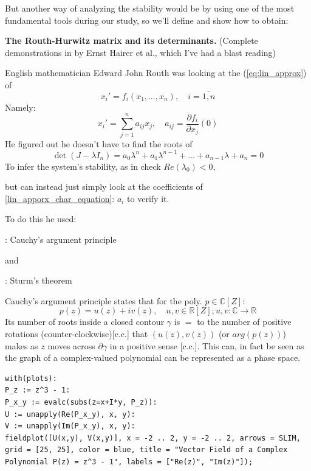 \hfill\break

But another way of analyzing the stability would be by using one of
the most fundamental tools during our study, so we'll define and show
how to obtain:

\textbf{The Routh-Hurwitz matrix and its determinants.}
(Complete demonstrations in \cite{hairer1993Nonstiff} by Ernst Hairer et al., which I've had a blast reading)

English mathematician Edward John Routh was looking at the
(\ref{eq:lin_approx}) of
\[
x_i' = f_i(x_1,\dots , x_n), \quad i = \overline{1,n}
\]
Namely:
\[
x_i' =\sum_{j=1}^{n}a_{ij} x_j, \quad a_{ij} = \frac{\partial
f_i}{\partial x_j}(0)
\]
He figured out he doesn't have to find the roots of
\begin{equation}\label{lin_apporx_char_equation}
\det(J - \lambda I_n) =
a_0 \lambda^n + a_1 \lambda^{n-1} + \dots + a_{n-1}\lambda + a_n = 0
\end{equation}
To infer the system's stability, as in check
$ Re(\lambda_0) < 0$,

but can instead just simply look at the coefficients of
\ref{lin_apporx_char_equation}: $a_{i}$ to verify it.

To do this he used:

: Cauchy's argument principle

and

: Sturm's theorem


Cauchy's argument principle states that for the poly. $p \in \mathbb{C}[Z]$:
\[
p(z) = u(z) + i v(z), \quad u, v \in \mathbb{R}[Z]; u,v : \mathbb{C}
\rightarrow \mathbb{R}
\]
Its number of roots inside a closed contour $\gamma$  is $=$ to the
number of positive rotations (counter-clockwise)[c.c.] that $(u(z),
v(z))$ (or $arg(p(z))$) makes as $z$ moves across $\partial \gamma$
in a positive sense [c.c.].
This can, in fact be seen as the graph of a complex-valued polynomial can be represented as a phase space.
\begin{verbatim}
with(plots):
P_z := z^3 - 1:
P_x_y := evalc(subs(z=x+I*y, P_z)):
U := unapply(Re(P_x_y), x, y):
V := unapply(Im(P_x_y), x, y):
fieldplot([U(x,y), V(x,y)], x = -2 .. 2, y = -2 .. 2, arrows = SLIM, grid = [25, 25], color = blue, title = "Vector Field of a Complex Polynomial P(z) = z^3 - 1", labels = ["Re(z)", "Im(z)"]);
\end{verbatim}


